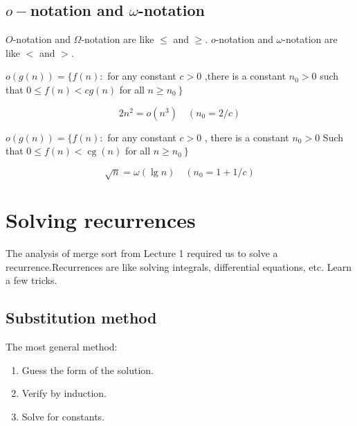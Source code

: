 \documentclass[11pt]{elegantbook}
\begin{document}
\subsection{$o-$notation and $\omega$-notation}
$O$-notation and $\Omega$-notation are like $\leq$ and $\geq$. $o$-notation and $\omega$-notation are like $<$ and $>$.
\begin{definition}[$o-$notation]
  $o(g(n))=\{f(n):$ for any constant $c>0$ ,there is a constant $n_{0}>0$ such that $0 \leq f(n)<c g(n)$ for all $\left.n \geq n_{0}\right\}$ 
\end{definition}
\begin{example}
  $$
2 n^{2}=o\left(n^{3}\right) \quad\left(n_{0}=2 / c\right)
$$
\end{example}
\begin{definition}
  $o(g(n))=\{f(n):$ for any constant $c>0$ , there is a constant $n_{0}>0$
  Such that $0 \leq f(n)<\operatorname{cg}(n)$
  for all $\left.n \geq n_{0}\right\}$
\end{definition}
\begin{example}
  $$
  \sqrt{n}=\omega(\lg n) \quad\left(n_{0}=1+1 / c\right)
  $$
\end{example}
\section{Solving recurrences}

The analysis of merge sort from Lecture 1 required us to solve a recurrence.Recurrences are like solving integrals, differential equations, etc. Learn a few tricks.

\subsection{Substitution method}
\begin{definition}
  The most general method:
  \begin{enumerate}
    \item Guess the form of the solution.
    \item Verify by induction.
    \item Solve for constants.
  \end{enumerate} 
\end{definition}
\end{document}
